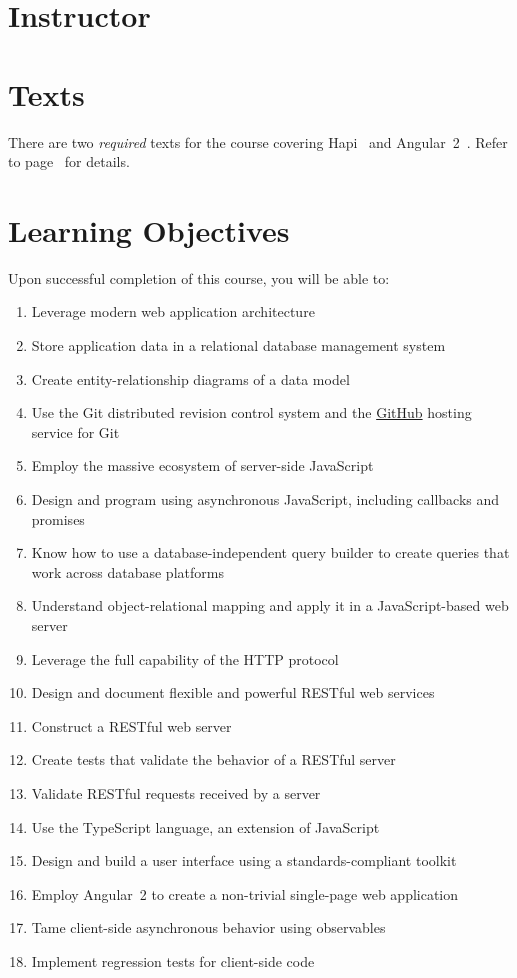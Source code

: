 \documentclass[11pt]{article}
\begin{document}

\section{Instructor}



\section{Texts}

There are two \emph{required} texts for the course
covering Hapi~\cite{hapijs} and Angular~2~\cite{angular2}.
Refer to page~\pageref{sec:references}
for details.

\section{Learning Objectives}

Upon successful completion of this course,
you will be able to:
\begin{enumerate}
\item Leverage modern web application architecture
\item Store application data in a relational database management system
\item Create entity-relationship diagrams of a data model
\item Use the Git distributed revision control system
  and the \href{https://github.com/}{GitHub} hosting service for Git
\item Employ the massive ecosystem of server-side JavaScript
\item Design and program using asynchronous JavaScript,
  including callbacks and promises
\item Know how to use a database-independent query builder
  to create queries that work across database platforms
\item Understand object-relational mapping
  and apply it in a JavaScript-based web server
\item Leverage the full capability of the HTTP protocol
\item Design and document flexible and powerful RESTful web services
\item Construct a RESTful web server
\item Create tests that validate the behavior of a RESTful server
\item Validate RESTful requests received by a server
\item Use the TypeScript language, an extension of JavaScript
\item Design and build a user interface using a standards-compliant toolkit 
\item Employ Angular~2 to create a non-trivial single-page web application
\item Tame client-side asynchronous behavior using observables
\item Implement regression tests for client-side code
\end{enumerate}
\end{document}
